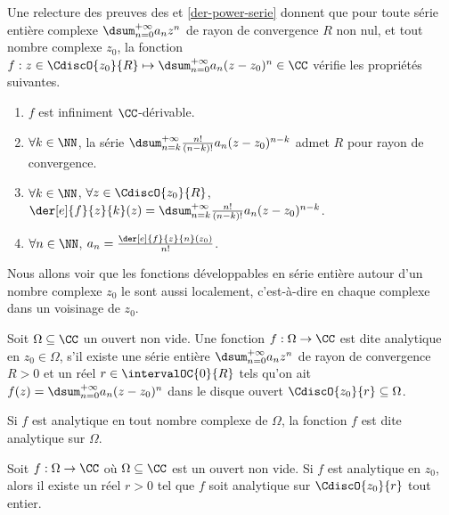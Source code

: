 \begin{remark} \label{der-power-serie-gene}
	Une relecture des preuves des  et \ref{der-power-serie} donnent que pour toute série entière complexe $\dsum_{n=0}^{+\infty} a_n z^n$ de rayon de convergence $R$ non nul,
	et tout nombre complexe $z_0$,
	la fonction $f: z \in \CdiscO{z_0}{R} \mapsto \dsum_{n=0}^{+\infty} a_n (z - z_0)^n \in \CC$ vérifie les propriétés suivantes.
    \begin{enumerate}
    	\item $f$ est infiniment $\CC$-dérivable.

    	\item $\forall k \in \NN$,
		la série $\dsum_{n = k}^{+\infty} \frac{n!}{(n-k)!} a_n (z - z_0)^{n - k}$ admet $R$ pour rayon de convergence.

    	\item $\forall k \in \NN$, $\forall z \in \CdiscO{z_0}{R}$,
		$\der[e]{f}{z}{k}(z) = \dsum_{n = k}^{+\infty} \frac{n!}{(n-k)!} a_n (z - z_0)^{n - k}$.

    	\item $\forall n \in \NN$, $a_n = \frac{\der[e]{f}{z}{n}(z_0)}{n!}$.
    \end{enumerate}
\end{remark}




Nous allons voir que les fonctions développables en série entière autour d'un nombre complexe $z_0$ le sont aussi localement, c'est-à-dire en chaque complexe dans un voisinage de $z_0$.


\begin{defi} \label{def-analytic}
    Soit $\Omega \subseteq \CC$ un ouvert non vide.
	Une fonction $f: \Omega \rightarrow \CC$ est dite analytique en $z_0 \in \Omega$, 
	s'il existe
	une série entière $\dsum_{n = 0}^{+\infty} a_n z^n$
	de rayon de convergence $R > 0$
	et
	un réel $r \in \intervalOC{0}{R}$ tels qu'on ait
	$f(z) = \dsum_{n = 0}^{+\infty} a_n (z - z_0)^n$
	dans le disque ouvert $\CdiscO{z_0}{r} \subseteq \Omega$.

	\smallskip
	
	Si $f$ est analytique en tout nombre complexe de $\Omega$,
	la fonction $f$ est dite analytique sur $\Omega$.
\end{defi}




\begin{fact} \label{power-serie-vs-analytic}
    Soit $f: \Omega \rightarrow \CC$ où $\Omega \subseteq \CC$ est un ouvert non vide.
    Si $f$ est analytique en $z_0$,
	alors
	il existe un réel $r > 0$ tel que $f$ soit analytique sur $\CdiscO{z_0}{r}$ tout entier. 
\end{fact}


